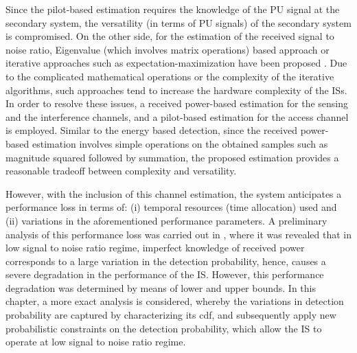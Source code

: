 Since the pilot-based estimation requires the knowledge of the PU signal at the secondary system, the versatility (in terms of PU signals) of the secondary system is compromised. On the other side, for the estimation of the received signal to noise ratio, Eigenvalue (which involves matrix operations) based approach \cite{Sharma13} or iterative approaches such as expectation-maximization have been proposed \cite{Chav11}. Due to the complicated mathematical operations or the complexity of the iterative algorithms, such approaches tend to increase the hardware complexity of the ISs. In order to resolve these issues, a received power-based estimation for the sensing and the interference channels, and a pilot-based estimation for the access channel is employed. Similar to the energy based detection, since the received power-based estimation involves simple operations on the obtained samples such as magnitude squared followed by summation, the proposed estimation provides a reasonable tradeoff between complexity and versatility. %

However, with the inclusion of this channel estimation, the system anticipates a performance loss in terms of: (i) temporal resources (time allocation) used and (ii) variations in the aforementioned performance parameters. A preliminary analysis of this performance loss was carried out in \cite{Kaushik15_CC}, where it was revealed that in low signal to noise ratio regime, imperfect knowledge of received power corresponds to a large variation in the detection probability, hence, causes a severe degradation in the performance of the IS. However, this performance degradation was determined by means of lower and upper bounds. In this chapter, a more exact analysis is considered, whereby the variations in detection probability are captured by characterizing its cdf, and subsequently apply new probabilistic constraints on the detection probability, which allow the IS to operate at low signal to noise ratio regime. %

